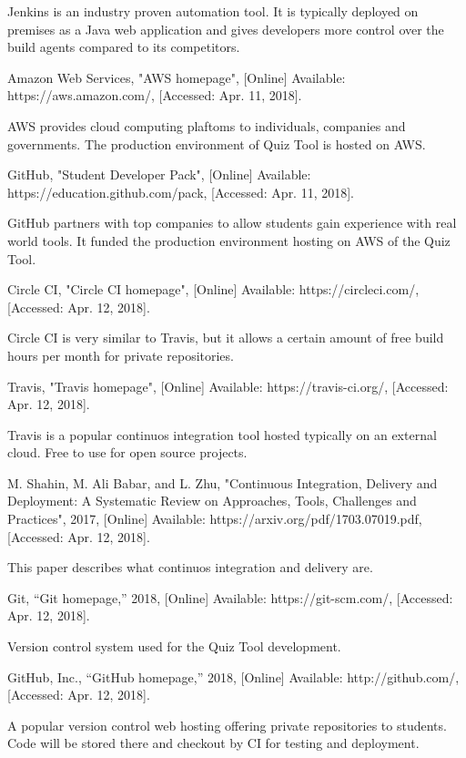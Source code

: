 \documentclass[11pt,a4paper]{report}
\begin{document}
\begin{thebibliography}{1}
  Jenkins is an industry proven automation tool. It is typically deployed
  on premises as a Java web application and gives developers more control over the build agents compared to its
  competitors.

 Amazon Web Services, "AWS homepage", [Online] Available: https://aws.amazon.com/, [Accessed: Apr. 11, 2018].

  AWS provides cloud computing plaftoms to individuals, companies and governments. The production environment of Quiz Tool is
  hosted on AWS.

 GitHub, "Student Developer Pack", [Online] Available: https://education.github.com/pack, [Accessed: Apr. 11, 2018].

  GitHub partners with top companies to allow students gain experience with real world tools. It funded the production
  environment hosting on AWS of the Quiz Tool.

 Circle CI, "Circle CI  homepage", [Online] Available: https://circleci.com/, [Accessed: Apr. 12, 2018].

  Circle CI is very similar to Travis, but it allows a certain amount of free build hours per month for private
  repositories.

 Travis, "Travis homepage", [Online] Available: https://travis-ci.org/, [Accessed: Apr. 12, 2018].

  Travis is a popular continuos integration tool hosted typically on an external cloud. Free to use for open source
  projects.

 M. Shahin, M. Ali Babar, and L. Zhu, "Continuous Integration, Delivery and Deployment: A Systematic Review on
    Approaches, Tools, Challenges and Practices", 2017, [Online] Available: https://arxiv.org/pdf/1703.07019.pdf, [Accessed: Apr. 12, 2018].

    This paper describes what continuos integration and delivery are.

 Git, “Git homepage,” 2018, [Online] Available: https://git-scm.com/, [Accessed: Apr. 12, 2018].

    Version control system used for the Quiz Tool development.

 GitHub, Inc., “GitHub homepage,” 2018, [Online] Available: http://github.com/, [Accessed: Apr. 12, 2018].

    A popular version control web hosting offering private repositories to students. Code will be stored there and checkout by CI for
    testing and deployment.


\end{thebibliography}
\end{document}
